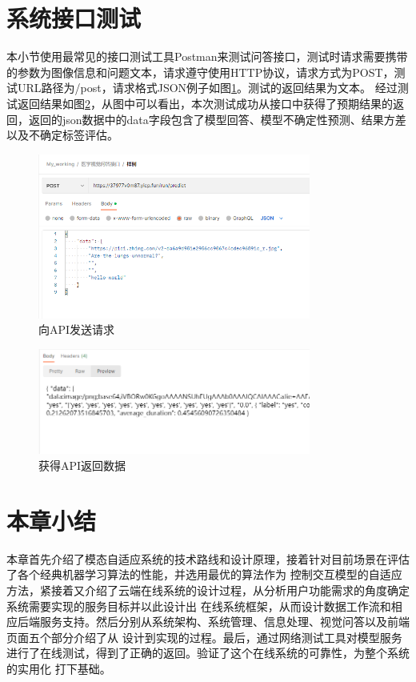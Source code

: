 \section{系统接口测试}
本小节使用最常见的接口测试工具Postman来测试问答接口，测试时请求需要携带的参数为图像信息和问题文本，请求遵守使用HTTP协议，请求方式为POST，测试URL路径为/post，请求格式JSON例子如图\ref{post}。测试的返回结果为文本。
经过测试返回结果如图\ref{get}，从图中可以看出，本次测试成功从接口中获得了预期结果的返回，返回的json数据中的data字段包含了模型回答、模型不确定性预测、结果方差以及不确定标签评估。
\begin{figure}[htbp]
	\centering	
	\includegraphics[width=0.8\textwidth]{Fig/myfig/chapter5/post.png}  %
	\caption{\label{post}向API发送请求} 
\end{figure}

\begin{figure}[htbp]
	\centering	
	\includegraphics[width=0.8\textwidth]{Fig/myfig/chapter5/post_get.png}  %
	\caption{\label{get}获得API返回数据} 
\end{figure}

\section{本章小结}
本章首先介绍了模态自适应系统的技术路线和设计原理，接着针对目前场景在评估了各个经典机器学习算法的性能，并选用最优的算法作为
控制交互模型的自适应方法，紧接着又介绍了云端在线系统的设计过程，从分析用户功能需求的角度确定系统需要实现的服务目标并以此设计出
在线系统框架，从而设计数据工作流和相应后端服务支持。然后分别从系统架构、系统管理、信息处理、视觉问答以及前端页面五个部分介绍了从
设计到实现的过程。最后，通过网络测试工具对模型服务进行了在线测试，得到了正确的返回。验证了这个在线系统的可靠性，为整个系统的实用化
打下基础。

